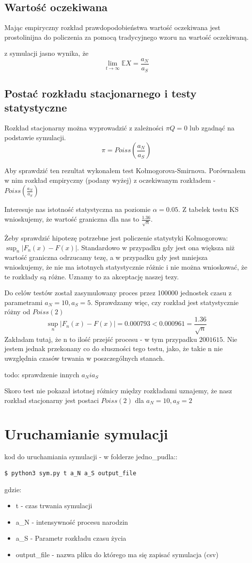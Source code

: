 \documentclass{article}
\begin{document}
\subsection{Wartość oczekiwana}

Mając empiryczny rozkład prawdopodobieństwa wartość oczekiwana jest prostolinijna do policzenia za pomocą tradycyjnego wzoru na wartość oczekiwaną.

z symulacji jasno wynika, że \[\lim_{t\rightarrow \infty}\mathbb{E}X = \frac{a_N}{a_S}\]
\subsection{Postać rozkładu stacjonarnego i testy statystyczne}
Rozkład stacjonarny można wyprowadzić z zależności $\pi  Q = 0$ lub zgadnąć na podstawie symulacji. 
\[\pi = Poiss(\frac{a_N}{a_S})\]

Aby sprawdzić ten rezultat wykonałem test Kołmogorova-Smirnova. Porównałem w nim rozkład empiryczny (podany wyżej) z oczekiwanym rozkładem - $Poiss(\frac{a_N}{a_S})$

Interesuje nas istotność statystyczna na poziomie $\alpha = 0.05$. Z tabelek testu KS wnioskujemy, że wartość graniczna dla nas to $\frac{1.36}{\sqrt{n}}$. 

Żeby sprawdzić hipotezę potrzebne jest policzenie statystyki Kołmogorowa: $\sup_n |F_n(x) - F(x)| $. Standardowo w przypadku gdy jest ona większa niż wartość graniczna odrzucamy tezę, a w przypadku gdy jest mniejsza wnioskujemy, że nie ma istotnych statystycznie różnic i nie można wnioskować, że te rozkłady są różne. Uznamy to za akceptację naszej tezy.

Do celów testów został zasymulowany proces przez 100000 jednostek czasu z parametrami $a_N = 10, a_S = 5$. 
Sprawdzamy więc, czy rozkład jest statystycznie różny od $Poiss(2)$
 \[\sup_n |F_n(x) - F(x)| = 0.000793 < 0.000961 = \frac{1.36}{\sqrt{n}}\]
Zakładam tutaj, że n to ilość przejść procesu - w tym przypadku $2001615$. Nie jestem jednak przekonany co do słuszności tego testu, jako, że takie n nie uwzględnia czasów trwania w poszczególnych stanach.

todo: sprawdzenie innych $a_N i a_S$

Skoro test nie pokazał istotnej różnicy między rozkładami uznajemy, że nasz rozkład stacjonarny jest postaci $Poiss(2)$ dla $a_N = 10, a_S = 2$

\section{Uruchamianie symulacji}
\noindent kod do uruchamiania symulacji - w folderze jedno\_pudla::
\begin{lstlisting}[language=bash]
  $ python3 sym.py t a_N a_S output_file 
\end{lstlisting}
gdzie: \begin{itemize}
\item t - czas trwania symulacji
\item a\_N - intensywność procesu narodzin
\item a\_S - Parametr rozkładu czasu życia
\item output\_file - nazwa pliku do którego ma się zapisać symulacja (csv)
\end{itemize}
\end{document}
